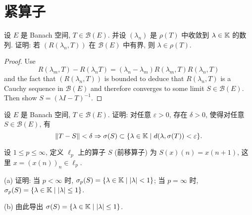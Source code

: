 \setcounter{chapter}{10}
\chapter{紧算子}


\begin{exercise}
    设 $E$ 是 Banach 空间, $T\in\mathcal{B}(E)$.
    并设 $(\lambda_n)$ 是 $\rho(T)$ 中收敛到 $\lambda\in\mathbb{K}$ 的数列.
    证明: 若 $(R(\lambda_n,T))$ 在 $\mathcal{B}(E)$ 中有界, 则 $\lambda\in\rho(T)$.
\end{exercise}

\begin{proof}
  Use
  \[R(\lambda_m, T) - R(\lambda_n T) = (\lambda_n - \lambda_m)
    R(\lambda_m, T) R(\lambda_n, T)\]
  and the fact that $(R(\lambda_n, T))$ is bounded to deduce that
  $R(\lambda_n, T)$ is a Cauchy sequence in $\mathcal{B}(E)$
  and therefore converges to some limit $S\in\mathcal{B}(E)$.
  Then show $S = (\lambda I-T)^{-1}$.
\end{proof}



\begin{exercise}
    设 $E$ 是 Banach 空间, $T\in\mathcal{B}(E)$.
    证明: 对任意 $\varepsilon>0$, 存在 $\delta>0$, 使得对任意 $S\in\mathcal{B}(E)$, 有
    \[\|T-S\|<\delta\Rightarrow\sigma(S)\subset\{\lambda\in\mathbb{K}\mid d(\lambda,\sigma(T))<\varepsilon\}.\]
\end{exercise}



\begin{exercise}
    设 $1\leq p\leq\infty$, 定义 $\ell_p$ 上的算子 $S$ (前移算子) 为 $S(x)(n)=x(n+1)$,
    这里 $x=(x(n))_n\in\ell_p$.

    (a) 证明: 当 $p<\infty$ 时, $\sigma_p(S)=\{\lambda\in\mathbb{K}\mid |\lambda|<1\}$;
    当 $p=\infty$ 时, $\sigma_p(S)=\{\lambda\in\mathbb{K}\mid |\lambda|\leq 1\}$.

    (b) 由此导出 $\sigma(S)=\{\lambda\in\mathbb{K}\mid |\lambda|\leq 1\}$.
\end{exercise}



